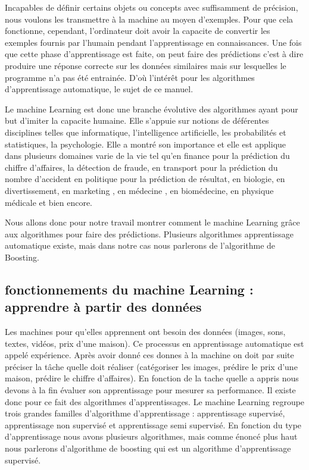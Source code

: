 \documentclass[french,a4paper,12pt]{article}
\begin{document}
\quad Incapables de définir certains objets ou concepts avec suffisamment de précision, nous voulons les transmettre à la machine au moyen d'exemples. Pour que cela fonctionne, cependant, l'ordinateur doit avoir la capacite de convertir les exemples fournis par l’humain pendant l’apprentissage en connaissances. Une fois que cette phase d’apprentissage est faite, on peut faire des prédictions c’est à dire produire une réponse correcte sur les données similaires mais sur lesquelles le programme n’a pas été entrainée.   D'où l’intérêt pour les algorithmes d’apprentissage automatique, le sujet de ce manuel.

\quad Le machine Learning est donc une branche évolutive des algorithmes ayant pour but d’imiter la capacite humaine. Elle s’appuie sur notions de déférentes disciplines telles que informatique, l’intelligence artificielle, les probabilités et statistiques, la psychologie.  Elle a montré son importance et elle est applique dans plusieurs domaines varie de la vie tel qu’en finance pour la prédiction du chiffre d’affaires, la détection de fraude, en transport pour la prédiction du nombre d’accident en politique pour la prédiction de résultat, en biologie, en divertissement, en marketing , en médecine , en biomédecine, en physique médicale et bien encore.



\quad Nous allons donc pour notre travail montrer comment le machine Learning grâce aux algorithmes pour faire des prédictions. Plusieurs algorithmes apprentissage automatique existe, mais dans notre cas nous parlerons de l’algorithme de Boosting.

\subsection{ fonctionnements du machine Learning : apprendre à partir des données }

\quad Les machines pour qu’elles apprennent ont besoin des données (images, sons, textes, vidéos, prix d’une maison). Ce processus en apprentissage automatique est appelé expérience. Après avoir donné ces donnes à la machine on doit par suite préciser la tâche  quelle doit réaliser (catégoriser les images, prédire le prix d’une maison, prédire le chiffre d’affaires). En fonction de la tache quelle a appris nous devons à la fin évaluer son apprentissage pour mesurer sa performance. Il existe donc pour ce fait des algorithmes d’apprentissages. Le machine Learning regroupe trois grandes familles d’algorithme d’apprentissage : apprentissage supervisé, apprentissage non supervisé et apprentissage semi supervisé. En fonction du type d’apprentissage nous avons plusieurs algorithmes, mais comme énoncé plus haut nous parlerons d’algorithme de boosting qui est un algorithme d’apprentissage supervisé\citep{elnaqa}. 
\end{document}
